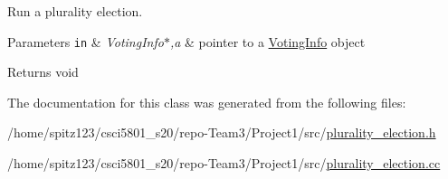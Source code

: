 Run a plurality election. 


\begin{DoxyParams}[1]{Parameters}
\mbox{\tt in}  & {\em Voting\+Info$\ast$,a} & pointer to a \hyperlink{classVotingInfo}{Voting\+Info} object \\
\hline
\end{DoxyParams}
\begin{DoxyReturn}{Returns}
void 
\end{DoxyReturn}


The documentation for this class was generated from the following files\+:\begin{DoxyCompactItemize}
\item 
/home/spitz123/csci5801\+\_\+s20/repo-\/\+Team3/\+Project1/src/\hyperlink{plurality__election_8h}{plurality\+\_\+election.\+h}\item 
/home/spitz123/csci5801\+\_\+s20/repo-\/\+Team3/\+Project1/src/\hyperlink{plurality__election_8cc}{plurality\+\_\+election.\+cc}\end{DoxyCompactItemize}
